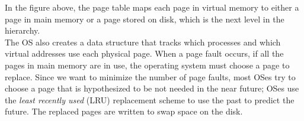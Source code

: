 \documentclass[12pt]{article}
\theoremstyle{definition}
\begin{document}
  \begin{figure}[H]
  \end{figure}

  In the figure above, the page table maps each page in virtual memory to either a page in main memory or a page stored on disk, which is the next level in the hierarchy. \\

  The OS also creates a data structure that tracks which processes and which virtual addresses use each physical page.
  When a page fault occurs, if all the pages in main memory are in use, the operating system must choose a page to replace.
  Since we want to minimize the number of page faults, most OSes try to choose a page that is hypothesized to be not needed in the near future;
  OSes use the \emph{least recently used} (LRU) replacement scheme to use the past to predict the future.
  The replaced pages are written to swap space on the disk. \\
\end{document}
